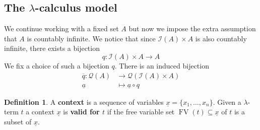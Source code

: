 \documentclass[12pt]{article}
\theoremstyle{plain}
\theoremstyle{definition}
\newtheorem{defn}[thm]{Definition} %
\newtheorem{remark}[thm]{Remark}
\newcommand{\call}[1]{\mathcal{#1}}
\newcommand{\Ical}{\call{I}}
\newcommand{\Qcal}{\call{Q}}
\newcommand{\lto}{\longrightarrow}
\begin{document}
	
%		
	
	\subsection{The $\lambda$-calculus model}
	
	We continue working with a fixed set $A$ but now we impose the extra assumption that $A$ is countably infinite. We notice that since $\Ical(A) \times A$ is also countably infinite, there exists a bijection
	\begin{equation}
		q: \Ical(A) \times A \lto A
	\end{equation}
	We fix a choice of such a bijection $q$. There is an induced bijection
	\begin{align*}
		\overline{q}: \Qcal(A) &\lto \Qcal(\Ical(A) \times A)\\
		\underline{a} &\longmapsto \underline{a} \circ q
	\end{align*}
	
	\begin{defn}
		A \textbf{context} is a sequence of variables $\underline{x} = \{ x_1, \ldots, x_n \}$. Given a $\lambda$-term $t$ a context $\underline{x}$ is \textbf{valid for $t$} if the free variable set $\operatorname{FV}(t) \subseteq \underline{x}$ of $t$ is a subset of $\underline{x}$.
	\end{defn}
	
\end{document}

